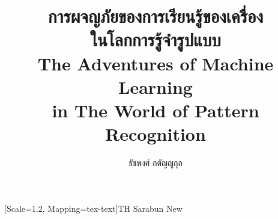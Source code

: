 

\usepackage{exercise}
\newtheorem{exercise}{แบบฝึกหัด}[chapter]
\def\ExerciseName{แบบฝึกหัด}

\usepackage{fancyvrb} 

\usepackage{fancyhdr}

\newcommand{\setfrontpagenumbering}{%
	\pagenumbering{thai}
}


\newcommand{\setmainpagenumbering}{%
	\pagenumbering{arabic}
}


\title{\vspace{0.8in}\textbf{\color{oceanboatblue} 
การผจญภัยของการเรียนรู้ของเครื่อง\\ในโลกการรู้จำรูปแบบ}\\
	\textbf{\Large\color{persianred} 
	The Adventures of Machine Learning\\
    in The World of Pattern Recognition}
}
\author{{\Large\color{yellow} ธัชพงศ์ กตัญญูกุล}}


\setdefaultlanguage{thai}  %
\newfontfamily{} %


\newfontfamily{\thaifont}[Scale=1.2, Mapping=tex-text]{TH Sarabun New}

